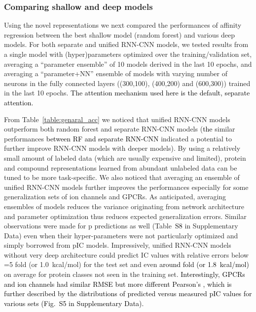 \documentclass[nocrop]{bioinfo}
\newcommand{\red}[1]{\textcolor{black}{#1}}
\begin{document}
\vspace{-1em}
\subsubsection{Comparing shallow and deep models}

Using the novel representations we next compared the performances of affinity regression between the best shallow model  (random forest) and various deep models.  For both separate and unified RNN-CNN models, we tested results from a single model with (hyper)parameters optimized over the training/validation set, averaging a ``parameter ensemble'' of 10 models derived in the last 10 epochs, and averaging a ``parameter+NN'' ensemble of models with varying number of neurons in the fully connected layers  ((300,100), (400,200) and  (600,300)) trained in the last 10 epochs.  \red{The attention mechanism used here is the default, separate attention.} 



From Table~\ref{table:genaral_acc} we noticed that unified RNN-CNN models outperform both random forest and separate RNN-CNN models  (\red{the} similar performances \red{between RF and separate RNN-CNN} indicated a potential to further improve RNN-CNN models with deeper models).  By using a relatively small amount of labeled data  (which are usually expensive and limited), protein and compound representations learned from abundant unlabeled data can be tuned to be more task-specific.  We also noticed that averaging an ensemble of unified RNN-CNN models further improves the performances especially for some generalization sets of ion channels and GPCRs. As anticipated, averaging ensembles of models reduces the variance  originating from network architecture and parameter optimization thus reduces expected generalization errors.  Similar observations were made for p predictions as well (Table~\red{S8} in Supplementary Data) even when their hyper-parameters were not particularly optimized and simply borrowed from pIC models.  Impressively, unified RNN-CNN models without very deep architecture could predict IC values with relative errors below =5 fold  (or 1.0~kcal/mol) for the test set and even \red{around  fold  (or 1.8~kcal/mol)} on average for protein classes not seen in the training set.  \red{Interestingly, GPCRs and ion channels had similar RMSE but more different Pearson's , which is further described by the distributions of predicted versus measured pIC values for various sets (Fig.~S5 in Supplementary Data).}  
\end{document}
